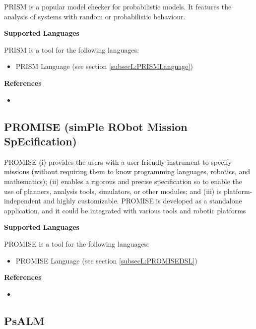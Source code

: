 PRISM is a popular model checker for probabilistic models. It features the analysis of systems with random or probabilistic behaviour.

\textbf{Supported Languages}

PRISM is a tool for the following languages:
\begin{itemize}
	\item PRISM Language (see section \ref{subsecL:PRISMLanguage})
\end{itemize}


\textbf{References}
\begin{itemize}
	
\item {}
\end{itemize}



\subsection{PROMISE (simPle RObot Mission SpEcification)}
\label{subsecT:PROMISE}


PROMISE (i) provides the users with a user-friendly instrument to specify missions (without requiring them to know programming languages, robotics, and mathematics); (ii) enables a rigorous and precise specification so to enable the use of planners, analysis tools, simulators, or other modules; and (iii) is platform-independent and highly customizable. PROMISE is developed as a standalone application, and it could be integrated with various tools and robotic platforms

\textbf{Supported Languages}

PROMISE is a tool for the following languages:
\begin{itemize}
	\item PROMISE Language (see section \ref{subsecL:PROMISEDSL})
\end{itemize}


\textbf{References}
\begin{itemize}
	
\item {}
\end{itemize}



\subsection{PsALM}
\label{subsecT:PsALM}


